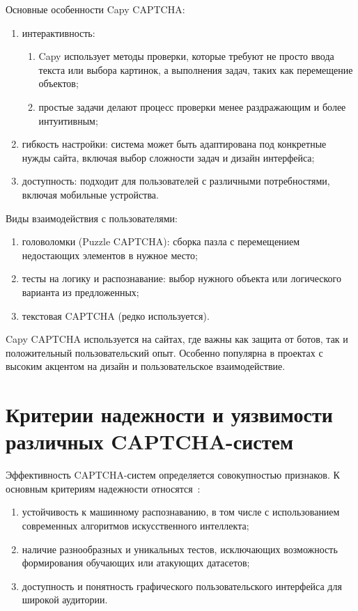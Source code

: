 Основные особенности Capy CAPTCHA:

\begin{enumerate}
    \item интерактивность:
    \begin{enumerate}
        \item Capy использует методы проверки, которые требуют не просто ввода 
        текста или выбора картинок, а выполнения задач, таких как перемещение 
        объектов;
        \item простые задачи делают процесс проверки менее раздражающим и более 
        интуитивным;
    \end{enumerate}
    \item гибкость настройки: система может быть адаптирована под конкретные 
    нужды сайта, включая выбор сложности задач и дизайн интерфейса;
    \item доступность: подходит для пользователей с различными потребностями, 
    включая мобильные устройства.
\end{enumerate}

Виды взаимодействия с пользователями:

\begin{enumerate}
    \item головоломки (Puzzle CAPTCHA): сборка пазла с перемещением недостающих 
    элементов в нужное место;
    \item тесты на логику и распознавание: выбор нужного объекта или 
    логического варианта из предложенных;
    \item текстовая CAPTCHA (редко используется).
\end{enumerate}

Capy CAPTCHA используется на сайтах, где важны как защита от ботов, так и 
положительный пользовательский опыт. Особенно популярна в проектах с высоким 
акцентом на дизайн и пользовательское взаимодействие.

\section{Критерии надежности и уязвимости различных CAPTCHA-систем}

Эффективность CAPTCHA-систем определяется совокупностью признаков. К основным 
критериям надежности относятся~\cite{captchawiki}:

\begin{enumerate}
    \item устойчивость к машинному распознаванию, в том числе с использованием 
    современных алгоритмов искусственного интеллекта;
    \item наличие разнообразных и уникальных тестов, исключающих возможность 
    формирования обучающих или атакующих датасетов;
    \item доступность и понятность графического пользовательского интерфейса для 
    широкой аудитории.
\end{enumerate}


